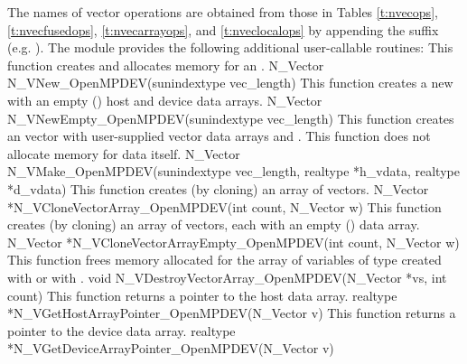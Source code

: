 The names of vector operations are obtained from those in Tables
\ref{t:nvecops}, \ref{t:nvecfusedops}, \ref{t:nvecarrayops}, and
\ref{t:nveclocalops} by appending the
suffix  (e.g. ). The module
{\nvecopenmpdev} provides the following additional user-callable routines:
{
  This function creates and allocates memory for an {\nvecopenmpdev} .
}
{
  N\_Vector N\_VNew\_OpenMPDEV(sunindextype vec\_length)
}
{
  This function creates a new {\nvecopenmpdev}  with an empty
  () host and device data arrays.
}
{
  N\_Vector N\_VNewEmpty\_OpenMPDEV(sunindextype vec\_length)
}
{
 This function creates an {\nvecopenmpdev} vector with user-supplied vector data
 arrays  and . This function does not allocate memory for
 data itself.
}
{
  N\_Vector N\_VMake\_OpenMPDEV(sunindextype vec\_length, realtype *h\_vdata,
  realtype *d\_vdata)
}
{
 This function creates (by cloning) an array of  {\nvecopenmpdev} vectors.
}
{
 N\_Vector *N\_VCloneVectorArray\_OpenMPDEV(int count, N\_Vector w)
}
{
 This function creates (by cloning) an array of  {\nvecopenmpdev} vectors, each with an
 empty () data array.
}
{
 N\_Vector *N\_VCloneVectorArrayEmpty\_OpenMPDEV(int count, N\_Vector w)
}
{
 This function frees memory allocated for the array of  variables of type
  created with  or with \newline
 .
}
{
 void N\_VDestroyVectorArray\_OpenMPDEV(N\_Vector *vs, int count)
}
{
 This function returns a pointer to the host data array.
}
{
 realtype *N\_VGetHostArrayPointer\_OpenMPDEV(N\_Vector v)
}
{
 This function returns a pointer to the device data array.
}
{
 realtype *N\_VGetDeviceArrayPointer\_OpenMPDEV(N\_Vector v)
}
